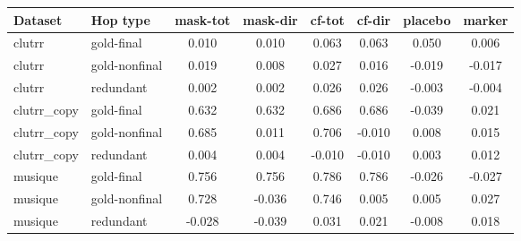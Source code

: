 \begin{tabular}{llcccccc}
\toprule
Dataset & Hop type & mask-tot & mask-dir & cf-tot & cf-dir & placebo & marker \\
\midrule
clutrr & gold-final & 0.010 & 0.010 & 0.063 & 0.063 & 0.050 & 0.006 \\
clutrr & gold-nonfinal & 0.019 & 0.008 & 0.027 & 0.016 & -0.019 & -0.017 \\
clutrr & redundant & 0.002 & 0.002 & 0.026 & 0.026 & -0.003 & -0.004 \\
clutrr\_copy & gold-final & 0.632 & 0.632 & 0.686 & 0.686 & -0.039 & 0.021 \\
clutrr\_copy & gold-nonfinal & 0.685 & 0.011 & 0.706 & -0.010 & 0.008 & 0.015 \\
clutrr\_copy & redundant & 0.004 & 0.004 & -0.010 & -0.010 & 0.003 & 0.012 \\
musique & gold-final & 0.756 & 0.756 & 0.786 & 0.786 & -0.026 & -0.027 \\
musique & gold-nonfinal & 0.728 & -0.036 & 0.746 & 0.005 & 0.005 & 0.027 \\
musique & redundant & -0.028 & -0.039 & 0.031 & 0.021 & -0.008 & 0.018 \\
\bottomrule
\end{tabular}
